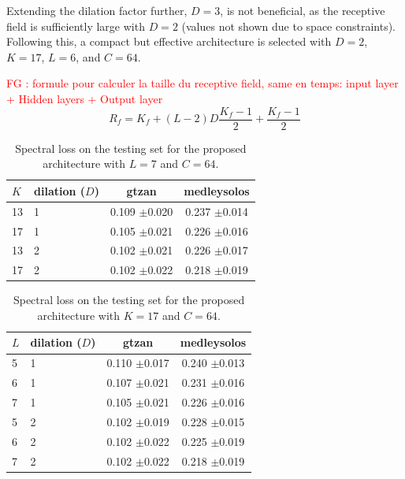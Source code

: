 \documentclass{article}
\newcommand{\fg}[1]{\textcolor{red}{FG : #1}}
\begin{document}
Extending the dilation factor further, $D=3$, is not beneficial, as the receptive field is sufficiently large with $D=2$ (values not shown due to space constraints). Following this, a compact but effective architecture is selected with $D=2$, $K=17$, $L=6$, and $C=64$.

\fg{formule pour calculer la taille du receptive field, same en temps: input layer + Hidden layers + Output layer}
\begin{equation}
R_f = K_f + (L-2)D\frac{K_f-1}{2} + \frac{K_f-1}{2}
\end{equation}


\begin{table}[t]
  \begin{center}
\begin{tabular}{llcc}
$K$ & dilation ($D$) & gtzan & medleysolos \\
\hline
13 & 1 & 0.109 $\pm$0.020 & 0.237 $\pm$0.014 \\
17 & 1 & 0.105 $\pm$0.021 & 0.226 $\pm$0.016 \\
13 & 2 & 0.102 $\pm$0.021 & 0.226 $\pm$0.017 \\
17 & 2 & 0.102 $\pm$0.022 & 0.218 $\pm$0.019 \\
\end{tabular}
\caption{Spectral loss on the testing set for the proposed architecture with $L=7$ and $C=64$.}
\label{tab:kvsd}
  \end{center}
  \vspace{-4mm}
\end{table}

\begin{table}[t]
  \begin{center}
\begin{tabular}{llcc}
$L$ & dilation ($D$) & gtzan & medleysolos \\
\hline
5 & 1 & 0.110 $\pm$0.017 & 0.240 $\pm$0.013 \\
6 & 1 & 0.107 $\pm$0.021 & 0.231 $\pm$0.016 \\
7 & 1 & 0.105 $\pm$0.021 & 0.226 $\pm$0.016 \\
5 & 2 & 0.102 $\pm$0.019 & 0.228 $\pm$0.015 \\
6 & 2 & 0.102 $\pm$0.022 & 0.225 $\pm$0.019 \\
7 & 2 & 0.102 $\pm$0.022 & 0.218 $\pm$0.019 \\
\end{tabular}
\caption{Spectral loss on the testing set for the proposed architecture with $K=17$ and $C=64$.}
\label{tab:lvsd}
\end{center}
\vspace{-4mm}
\end{table}
\end{document}
